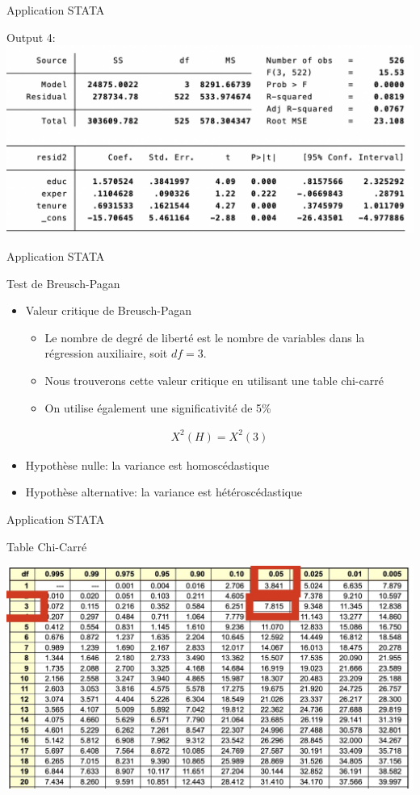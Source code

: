 \documentclass{beamer}
\begin{document}
\begin{frame}{Application STATA}
\begin{block}{Output 4:}
\includegraphics[scale=.5]{aux2.png}
\end{block}
\end{frame}


\begin{frame}{Application STATA}
\begin{block}{Test de Breusch-Pagan}
\begin{itemize}
\item Valeur critique de Breusch-Pagan
\begin{itemize}
\item Le nombre de degré de liberté est le nombre de variables dans la régression auxiliaire, soit $df=3$.
\item Nous trouverons cette valeur critique en utilisant une table chi-carré
\item On utilise également une significativité de 5\%
\end{itemize}
\begin{align*}
X^2(H)=X^2(3)
\end{align*}
\item Hypothèse nulle: la variance est homoscédastique
\item Hypothèse alternative: la variance est hétéroscédastique
\end{itemize}
\end{block}

\end{frame}

\begin{frame}{Application STATA}
\begin{block}{Table Chi-Carré}
\begin{center}
\includegraphics[scale=.17]{chitable_2.png}
\end{center}
\end{block}
\end{frame}
\end{document}
